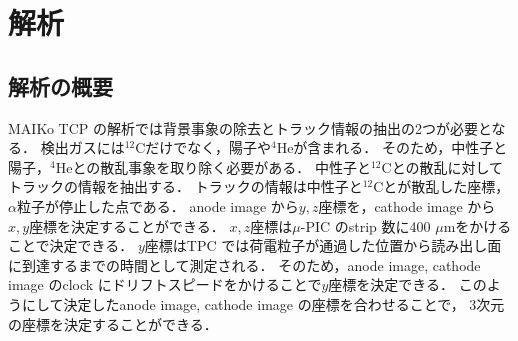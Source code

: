 \documentclass[../master]{subfiles}
\begin{document}
\chapter{解析}
%
%
%
\section{解析の概要}
MAIKo TCP の解析では背景事象の除去とトラック情報の抽出の2つが必要となる．
検出ガスには${}^{12}\mathrm{C}$だけでなく，陽子や${}^{4}\mathrm{He}$が含まれる．
そのため，中性子と陽子，${}^{4}\mathrm{He}$との散乱事象を取り除く必要がある．
中性子と${}^{12}\mathrm{C}$との散乱に対してトラックの情報を抽出する．
トラックの情報は中性子と${}^{12}\mathrm{C}$とが散乱した座標，
$\alpha$粒子が停止した点である．
anode image から$y, z$座標を，cathode image から$x, y$座標を決定することができる．
$x, z$座標は$\mu$-PIC のstrip 数に400 $\mu$mをかけることで決定できる．
$y$座標はTPC では荷電粒子が通過した位置から読み出し面に到達するまでの時間として測定される．
そのため，anode image, cathode image のclock にドリフトスピードをかけることで$y$座標を決定できる．
このようにして決定したanode image, cathode image の座標を合わせることで，
3次元の座標を決定することができる．
\end{document}
